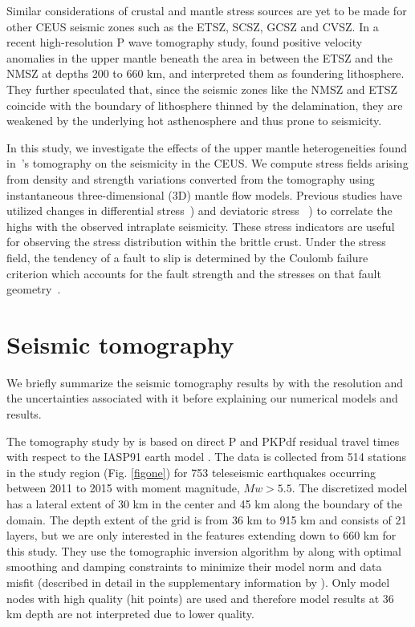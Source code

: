 \documentclass[draft,linenumbers]{agujournal2018}
\begin{document}
     Similar considerations of crustal and mantle stress sources are yet to be made for other CEUS seismic zones such as the ETSZ, SCSZ, GCSZ and CVSZ. In a recent high-resolution P wave tomography study, \citet{Biryol_2016} found positive velocity anomalies in the upper mantle beneath the area in between the ETSZ and the NMSZ at depths 200 to 660 km, and interpreted them as foundering lithosphere. They further speculated that, since the seismic zones like the NMSZ and ETSZ coincide with the boundary of lithosphere thinned by the delamination, they are weakened by the underlying hot asthenosphere and thus prone to seismicity. 
    
    In this study, we investigate the effects of the upper mantle heterogeneities found in~\citet{Biryol_2016}'s tomography on the seismicity in the CEUS. We compute stress fields arising from density and strength variations converted from the tomography using instantaneous three-dimensional (3D) mantle flow models. %
Previous studies have utilized changes in differential stress~\citep[e.g.,][]{baird2010relationship, zhan2016stress}) and deviatoric stress ~\citep[e.g.,][]{levandowski2016dense}) to correlate the highs with the observed intraplate seismicity. These stress indicators are useful for  observing the stress distribution within the brittle crust. Under the stress field, the tendency of a fault to slip is determined by the Coulomb failure criterion which accounts for the fault strength and the stresses on that fault geometry~\citep{king1994static, freed2005earthquake, li2007stress}. 

\section{Seismic tomography}
We briefly summarize the seismic tomography results by \citet{Biryol_2016} with the resolution and the uncertainties associated with it before explaining our numerical models and results.

    The tomography study by \citet{Biryol_2016} is based on direct P and PKPdf residual travel times with respect to the IASP91 earth model \citep{kennett1991traveltimes}. The data is collected from 514 stations in the study region (Fig. \ref{figone}) for 753 teleseismic earthquakes occurring between 2011 to 2015 with moment magnitude, $Mw > 5.5$. The discretized model has a lateral extent of 30 km in the center and 45 km along the boundary of the domain. The depth extent of the grid is from 36 km to 915 km and consists of 21 layers, but we are only interested in the features extending down to 660 km for this study. They use the tomographic inversion algorithm by \citet{schmandt2010seismic} along with optimal smoothing and damping constraints to minimize their model norm and data misfit (described in detail in the supplementary information by \citet{Biryol_2016}). Only model nodes with high quality (hit points) are used and therefore model results at 36 km depth are not interpreted due to lower quality.
    
\end{document}
